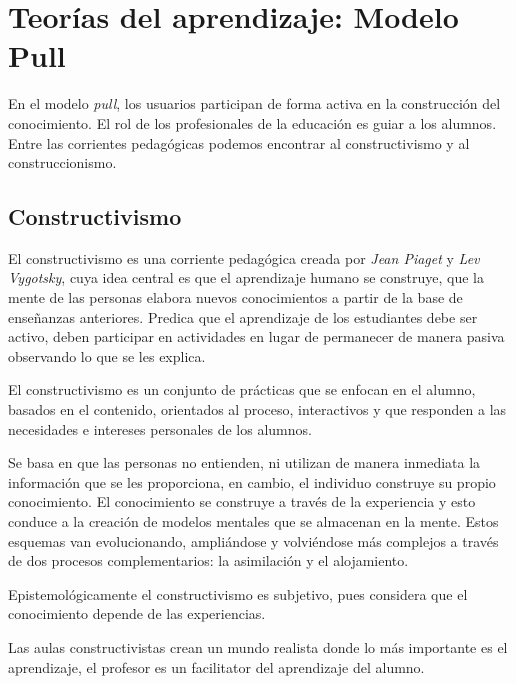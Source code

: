 \section{Teorías del aprendizaje: Modelo Pull}

En el modelo \textit{pull}, los usuarios participan de forma activa en la
construcción del conocimiento. El rol de los profesionales de la educación es
guiar a los alumnos. Entre las corrientes pedagógicas podemos encontrar al
constructivismo y al construccionismo.

\subsection{Constructivismo}

El constructivismo es una corriente pedagógica creada por \textit{Jean Piaget} y
\textit{Lev Vygotsky}, cuya idea central es que el aprendizaje humano se
construye, que la mente de las personas elabora nuevos conocimientos a partir de
la base de enseñanzas anteriores\cite{martin2008modelo}. Predica que el
aprendizaje de los estudiantes debe ser activo, deben participar en actividades
en lugar de permanecer de manera pasiva observando lo que se les
explica\cite{hernandez:constructivismo,johnson2005instructionism}.

El constructivismo es un conjunto de prácticas que se enfocan en el alumno,
basados en el contenido, orientados al proceso, interactivos y que responden a
las necesidades e intereses personales de los
alumnos\cite{johnson2005instructionism}.

Se basa en que las personas no entienden, ni utilizan de manera inmediata la
información que se les proporciona, en cambio, el individuo construye su propio
conocimiento. El conocimiento se construye a través de la experiencia y esto
conduce a la creación de modelos mentales que se almacenan en la mente. Estos
esquemas van evolucionando, ampliándose y volviéndose más complejos a través de
dos procesos complementarios: la asimilación y el
alojamiento\cite{hernandez:constructivismo,johnson2005instructionism}.

Epistemológicamente el constructivismo es subjetivo, pues considera que el
conocimiento depende de las experiencias\cite{johnson2005instructionism}. 

Las aulas constructivistas crean un mundo realista donde lo más importante es el
aprendizaje, el profesor es un facilitator del aprendizaje del
alumno\cite{johnson2005instructionism,nanjappa2003constructing}.


